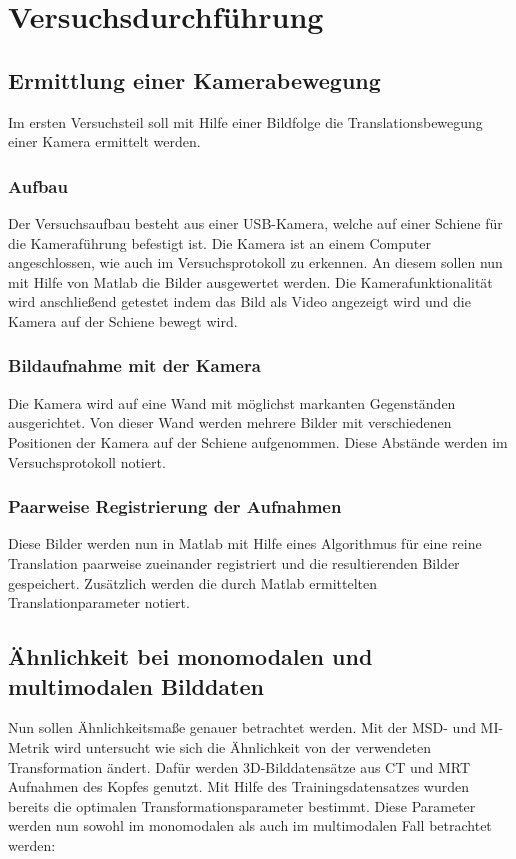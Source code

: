 \section{Versuchsdurchführung}
\subsection{Ermittlung einer Kamerabewegung}
Im ersten Versuchsteil soll mit Hilfe einer Bildfolge die Translationsbewegung
einer Kamera ermittelt werden.

\subsubsection{Aufbau}
Der Versuchsaufbau besteht aus einer USB-Kamera, welche auf einer Schiene für
die Kameraführung befestigt ist. Die Kamera ist an einem Computer
angeschlossen, wie auch im Versuchsprotokoll zu erkennen. An diesem sollen nun
mit Hilfe von Matlab die Bilder ausgewertet werden. Die Kamerafunktionalität
wird anschließend getestet indem das Bild als Video angezeigt wird und die
Kamera auf der Schiene bewegt wird.

\subsubsection{Bildaufnahme mit der Kamera}
Die Kamera wird auf eine Wand mit möglichst markanten Gegenständen
ausgerichtet. Von dieser Wand werden mehrere Bilder mit verschiedenen
Positionen der Kamera auf der Schiene aufgenommen. Diese Abstände werden im
Versuchsprotokoll notiert.

\subsubsection{Paarweise Registrierung der Aufnahmen}
Diese Bilder werden nun in Matlab mit Hilfe eines Algorithmus für eine reine
Translation paarweise zueinander registriert und die resultierenden Bilder
gespeichert. Zusätzlich werden die durch Matlab ermittelten Translationparameter
notiert.

\subsection{Ähnlichkeit bei monomodalen und multimodalen Bilddaten}
Nun sollen Ähnlichkeitsmaße genauer betrachtet werden. Mit der MSD- und
MI-Metrik wird untersucht wie sich die Ähnlichkeit von der verwendeten
Transformation ändert. Dafür werden 3D-Bilddatensätze aus CT und MRT Aufnahmen
des Kopfes genutzt. Mit Hilfe des Trainingsdatensatzes wurden bereits die
optimalen Transformationsparameter bestimmt. Diese Parameter werden nun sowohl
im monomodalen als auch im multimodalen Fall betrachtet werden:


